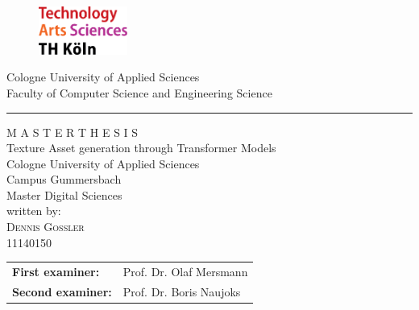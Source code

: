 \documentclass[a4paper,12pt,oneside]{article}
\begin{document}
    
    \pagestyle{empty}
    \begin{titlepage}
    \begin{figure}[!ht]
            \includegraphics[width=0.26\textwidth]{latex/sources/logo_TH-Koeln_CMYK_22pt.png}
    \end{figure}

    \begin{center}
      \Large
      Cologne University of Applied Sciences\\
      Faculty of Computer Science and Engineering Science\\
      \hrule\par\rule{0pt}{2cm} %
      \LARGE
      \textsc{M A S T E R  T H E S I S}\\
      \vspace{1cm} %
      \huge
      Texture Asset generation through Transformer Models\\
      \vspace{1.5cm}
      \large
      Cologne University of Applied Sciences\\
      Campus Gummersbach\\
      Master Digital Sciences\\ 
      \vspace{1.0cm}
      written by:\\
      \textsc{Dennis Goßler}\\
      11140150\\
      \vspace{1.5cm}
      \begin{tabular}{ll} %
          \textbf{First examiner:} & Prof. Dr. Olaf Mersmann \\
          \textbf{Second examiner:} & Prof. Dr. Boris Naujoks \\
      \end{tabular}
    
    \end{center}    
    \end{titlepage}
    
\end{document}
